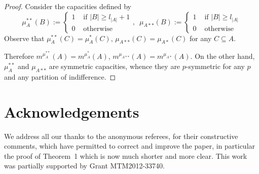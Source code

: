 \documentclass[12pt,a4paper]{article}
\theoremstyle{definition}
\theoremstyle{remark}
\begin{document}
\begin{proof}
Consider the capacities defined by
\[
\mu_A^{**} (B):=\left\{ \begin{array}{cc} 1 & \mbox{~if~} |B| \geq l_{|A|}+1
  \\ 0 & \mbox{~otherwise} \end{array}\right. ,\, \, \, \mu_{A**}
(B):=\left\{ \begin{array}{cc} 1 & \mbox{~if~} |B| \geq l_{|A|} \\ 0 &
  \mbox{~otherwise} \end{array}\right.
\]
 Observe that
$\mu_A^{**}(C)=\mu_A^{*}(C),\, \mu_{A**} (C)=\mu_{A*} (C)$ for any $C\subseteq
A.$

Therefore $m^{\mu^{**}_A}(A)=m^{\mu^*_A}(A)$, $m^{\mu_{A**}}(A)=m^{\mu_{A*}}(A).$
On the other hand, $\mu_A^{**}$ and $\mu_{A**}$ are symmetric capacities, whence
they are $p$-symmetric for any $p$ and any partition of indifference.
\end{proof}

\section{{\bf Acknowledgements}}

We address all our thanks to the anonymous referees, for their constructive
comments, which have permitted to correct and improve the paper, in particular
the proof of Theorem~1 which is now much shorter and more clear.  This work was
partially supported by Grant MTM2012-33740.





\end{document}
